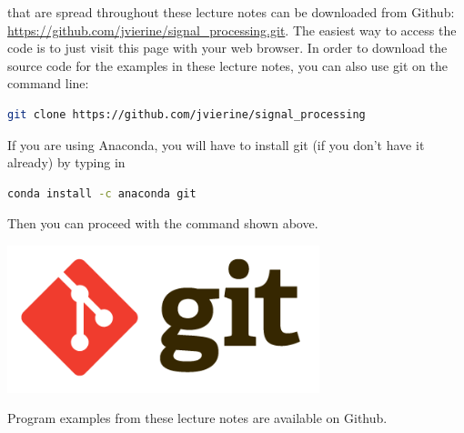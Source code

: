  that are spread throughout these lecture
notes can be downloaded from Github:
\url{https://github.com/jvierine/signal_processing.git}. The easiest
way to access the code is to just visit this page with your web
browser. In order to download the source code for the examples in
these lecture notes, you can also use git on the command line:
\begin{lstlisting}[language=sh,caption=Obtaining the source code for the programming examples with git,label=lst:download]
git clone https://github.com/jvierine/signal_processing
\end{lstlisting}
If you are using Anaconda, you will have to install git (if you don't
have it already) by typing in
\begin{lstlisting}[language=sh,caption=Obtaining the source code for the programming examples with git,label=lst:download]
  conda install -c anaconda git
\end{lstlisting}
Then you can proceed with the command shown above. 

\begin{marginfigure}
\includegraphics[width=0.68\textwidth]{ch02/figures/gitlogo.png}
\caption{Program examples from these lecture notes are available on Github.}
\end{marginfigure}
